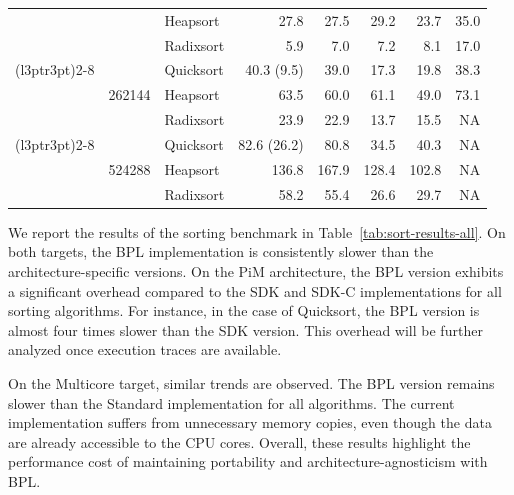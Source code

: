\begin{table}[!t]
{\begin{tabular}{lllrrrrr}
     &  & Heapsort  & 27.8 & 27.5 & 29.2 & 23.7 & 35.0 \\
     &  & Radixsort & 5.9 & 7.0 & 7.2 & 8.1 & 17.0 \\
\cmidrule(l{3pt}r{3pt}){2-8}
     & \multirow{3}{*}{262144} & Quicksort & 40.3 (9.5) & 39.0 & 17.3 & 19.8 & 38.3 \\
     &  & Heapsort  & 63.5 & 60.0 & 61.1 & 49.0 & 73.1 \\
     &  & Radixsort & 23.9 & 22.9 & 13.7 & 15.5 & NA \\
\cmidrule(l{3pt}r{3pt}){2-8}
     & \multirow{3}{*}{524288} & Quicksort & 82.6 (26.2) & 80.8 & 34.5 & 40.3 & NA \\
     &  & Heapsort  & 136.8 & 167.9 & 128.4 & 102.8 & NA \\
     &  & Radixsort & 58.2 & 55.4 & 26.6 & 29.7 & NA \\
\bottomrule
\end{tabular}}
\end{table}

We report the results of the sorting benchmark in Table~\ref{tab:sort-results-all}.
On both targets, the BPL implementation is consistently slower than the architecture-specific versions.
On the PiM architecture, the BPL version exhibits a significant overhead compared to the SDK and SDK-C implementations for all sorting algorithms.
For instance, in the case of Quicksort, the BPL version is almost four times slower than the SDK version.
This overhead will be further analyzed once execution traces are available.

On the Multicore target, similar trends are observed.
The BPL version remains slower than the Standard implementation for all algorithms.
The current implementation suffers from unnecessary memory copies, even though the data are already accessible to the CPU cores.
Overall, these results highlight the performance cost of maintaining portability and architecture-agnosticism with BPL.